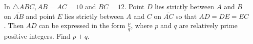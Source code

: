 In \(\triangle ABC, AB = AC = 10\) and \(BC = 12\). Point \(D\) lies strictly between \(A\) and \(B\) on \(\overline{AB}\) and point \(E\) lies strictly between \(A\) and \(C\) on \(\overline{AC}\) so that \(AD = DE = EC\). Then \(AD\) can be expressed in the form \(\tfrac{p}{q}\), where \(p\) and \(q\) are relatively prime positive integers. Find \(p + q\).